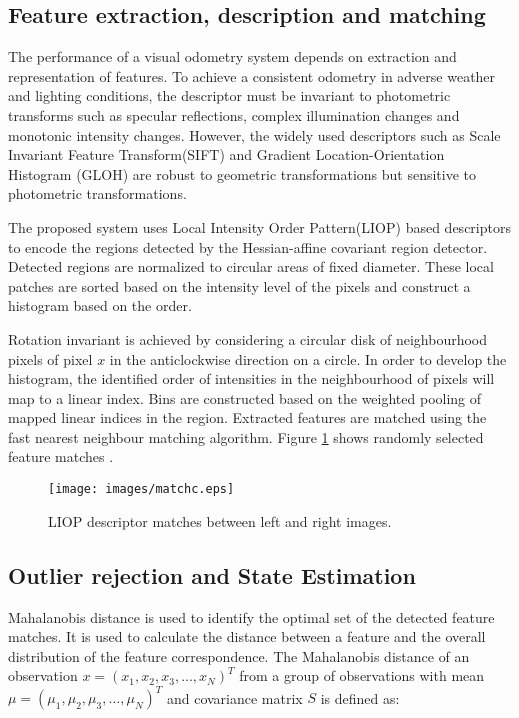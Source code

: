 \documentclass{article}
\begin{document}
\subsection{Feature extraction, description and matching }
The performance of a visual odometry system  depends on extraction and representation of features. To achieve a consistent odometry in adverse weather and lighting conditions, the descriptor must be invariant to photometric transforms such as  specular reflections, complex illumination changes and monotonic intensity changes.
However, the widely used descriptors such as Scale Invariant Feature Transform(SIFT) and Gradient Location-Orientation Histogram (GLOH) are robust to geometric transformations but sensitive to  photometric transformations.
\par
The proposed system uses  Local Intensity Order Pattern(LIOP)\cite{wang2011local} based descriptors to encode  the regions detected by the Hessian-affine covariant region detector. Detected regions are normalized to circular areas of fixed diameter. These local patches are sorted based on the intensity level of the pixels and construct a histogram based on the order. 

\par
Rotation invariant is achieved by considering a circular disk of neighbourhood pixels of pixel $x$ in the anticlockwise direction on a circle. In order to develop  the histogram, the identified order of intensities in the neighbourhood  of pixels will map to a linear index. Bins are constructed based on the weighted pooling of mapped linear indices  in the region. Extracted features are matched using the fast nearest neighbour matching algorithm. Figure \ref{lmatch} shows randomly selected feature matches .

\begin{figure}[ht]
 \centering
 \texttt{[image: images/matchc.eps]}
\caption{LIOP descriptor matches between  left and right images.}
\label{lmatch}
\end{figure}
\subsection{Outlier rejection and State Estimation}
Mahalanobis distance is used to identify the optimal set of the detected feature matches. It is used to calculate the distance between a feature and the overall distribution of the feature correspondence. The Mahalanobis distance \cite{de2000mahalanobis} of an observation $x = ( x_1, x_2, x_3, \dots, x_N )^T$ from a group of observations with mean $\mu = ( \mu_1, \mu_2, \mu_3, \dots , \mu_N )^T$ and covariance matrix $S$ is defined as:
\end{document}
